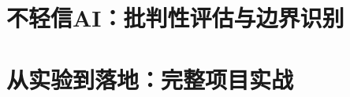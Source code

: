 \documentclass[10pt,oneside,fontset=fandol]{ctexbook}
\begin{document}
\part{不轻信AI：批判性评估与边界识别}




\part{从实验到落地：完整项目实战}





\appendix


\backmatter
\nocite{*}

\end{document}
